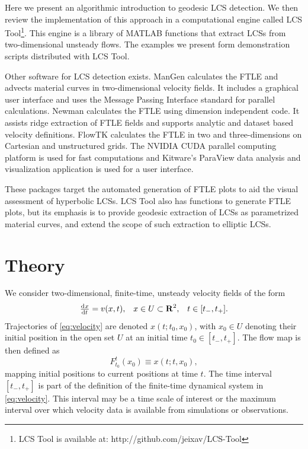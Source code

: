\documentclass[5p]{elsarticle}
\begin{document}
\begin{sloppypar}
Here we present an algorithmic introduction to geodesic LCS detection.
We then review the implementation of this approach in a computational engine called LCS Tool\footnote{LCS Tool is available at: http://github.com/jeixav/LCS-Tool}. This engine is a library of MATLAB functions that extract LCSs from two-dimensional unsteady flows. The examples we present form demonstration scripts distributed with LCS Tool.
\end{sloppypar}

\begin{sloppypar}
Other software for LCS detection exists.
ManGen\citep{lekien03:_time} calculates the FTLE and advects material curves in two-dimensional velocity fields.
It includes a graphical user interface and uses the Message Passing Interface standard for parallel calculations.
Newman\citep{toit10:_trans} calculates the FTLE using dimension independent code.
It assists ridge extraction of FTLE fields and supports analytic and dataset based velocity definitions.
FlowTK\citep{ameli14:_devel_effic_flexib_pipel_lagran} calculates the FTLE in two and three-dimensions on Cartesian and unstructured grids.
The NVIDIA CUDA parallel computing platform is used for fast computations and Kitware's ParaView data analysis and visualization application is used for a user interface.
\end{sloppypar}

\begin{sloppypar}
These packages target the automated generation of FTLE plots to aid the visual assessment of hyperbolic LCSs.
LCS Tool also has functions to generate FTLE plots, but its emphasis is to provide geodesic extraction of LCSs as parametrized material curves, and extend the scope of such extraction to elliptic LCSs.
\end{sloppypar}

\section{Theory}

We consider two-dimensional, finite-time, unsteady velocity fields of the form
\begin{align}
\od{x}{t} = v(x,t), && x \in U \subset \mathbf R^2, && t \in [t_-,t_+].
\label{eq:velocity}
\end{align}
Trajectories of \cref{eq:velocity} are denoted $x(t;t_0,x_0)$, with $x_0 \in U$ denoting their initial position in the open set $U$ at an initial time $t_0 \in [t_-,t_+]$. The flow map is then defined as
\[
F_{t_0}^t(x_0) \equiv x(t;t,x_0),
\]
mapping initial positions to current positions at time $t$. The time interval $[t_-,t_+]$ is part of the definition of the finite-time dynamical system in \cref{eq:velocity}. This interval may be a time scale of interest or the maximum interval over which velocity data is available from simulations or observations.
\end{document}
